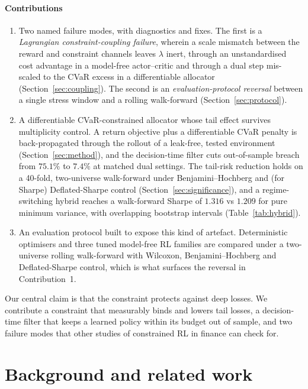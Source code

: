 \documentclass[sigconf]{acmart}
\begin{document}
\paragraph{Contributions}
\begin{enumerate}
\item Two named failure modes, with diagnostics and fixes. The first is a \emph{Lagrangian constraint-coupling failure}, wherein a scale mismatch between the reward and constraint
channels leaves $\lambda$ inert, through an unstandardised cost advantage in a model-free
actor--critic and through a dual step mis-scaled to the CVaR excess in a differentiable
allocator (Section~\ref{sec:coupling}). The second is an \emph{evaluation-protocol reversal} between a
single stress window and a rolling walk-forward (Section~\ref{sec:protocol}).
\item A differentiable CVaR-constrained allocator whose tail effect survives
multiplicity control. A return objective plus a differentiable CVaR penalty is
back-propagated through the rollout of a leak-free, tested environment
(Section~\ref{sec:method}), and the decision-time filter cuts out-of-sample breach from
$75.1\%$ to $7.4\%$ at matched dual settings. The tail-risk reduction holds on a 40-fold,
two-universe walk-forward under Benjamini--Hochberg and (for Sharpe) Deflated-Sharpe
control (Section~\ref{sec:significance}), and a regime-switching hybrid reaches a walk-forward Sharpe
of $1.316$ vs $1.209$ for pure minimum variance, with overlapping bootstrap intervals
(Table~\ref{tab:hybrid}).
\item An evaluation protocol built to expose this kind of artefact. Deterministic
optimisers and three tuned model-free RL families are compared under a two-universe rolling
walk-forward with Wilcoxon, Benjamini--Hochberg and Deflated-Sharpe control, which is what
surfaces the reversal in Contribution~1.
\end{enumerate}

Our central claim is that the constraint protects against deep losses. We contribute a constraint that measurably
binds and lowers tail losses, a decision-time filter that keeps a learned policy within its
budget out of sample, and two failure modes that other studies of constrained RL in finance
can check for.

\section{Background and related work}
\label{sec:related}
\end{document}
